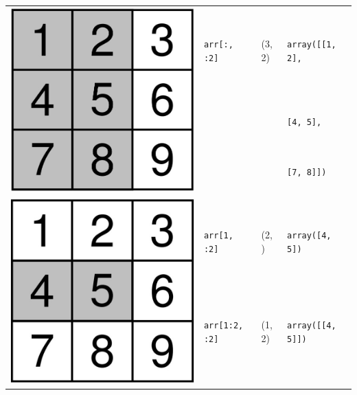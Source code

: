 \begin{tabular}{|l|l|l|l|}
	\multirow{3}{0.1\linewidth}{\includegraphics[width=\linewidth]{images/v8_numpy4}} &\texttt{arr[:, :2]} &(3, 2) &\texttt{array([[1, 2],}\\
	& & &\texttt{[4, 5],}\\
	& & &\texttt{[7, 8]])}\\
	\hline
	\multirow{3}{0.1\linewidth}{\includegraphics[width=\linewidth]{images/v8_numpy5}} &\texttt{arr[1, :2]} &(2, ) &\texttt{array([4, 5])}\\
	&\texttt{arr[1:2, :2]} &(1, 2) &\texttt{array([[4, 5]])}\\
	& & &\\
	\hline
\end{tabular}\\
